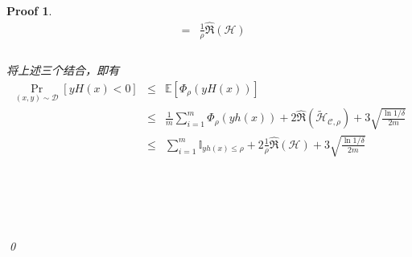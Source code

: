 \documentclass[a4paper,UTF8]{article}
\numberwithin{equation}{section}
\newtheorem*{myProof}{Proof}
\begin{document}
\begin{myProof}
\begin{eqnarray*}
&=& \frac{1}{\rho} \hat{\mathfrak{R}}(\mathcal{H}) \\
\end{eqnarray*} ~\\
将上述三个结合，即有
\begin{eqnarray*}
\Pr_{(x,y)\sim \mathcal{D}}[yH(x)<0] &\le& \mathbb{E}[ \Phi_\rho(yH(x)) ] \\
&\le& \frac{1}{m}\sum_{i=1}^m \Phi_\rho(yh(x)) + 2 \hat{\mathfrak{R}}(\tilde{\mathcal{H}}_{\mathcal{C},\rho}) + 3 \sqrt{\frac{\ln 1 / \delta}{2m}} \\
&\le& \sum_{i=1}^m \mathbb{I}_{yh(x) \le \rho} + 2 \frac{1}{\rho} \hat{\mathfrak{R}}(\mathcal{H}) + 3 \sqrt{\frac{\ln 1 / \delta}{2m}} \\
\end{eqnarray*}

	~\\
	~\\
	~\\
	~\\
	\qed
\end{myProof}
\newpage
\end{document}
